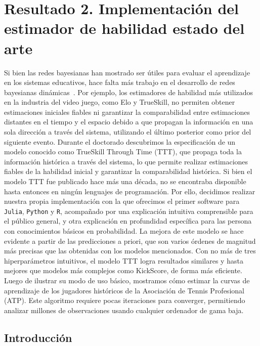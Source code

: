 \documentclass[a4paper,11pt]{book}
\theoremstyle{definition}
\begin{document}
\chapter{Resultado 2. Implementaci\'on del estimador de habilidad estado del arte} \label{ch_ttt}

Si bien las redes bayesianas han mostrado ser \'utiles para evaluar el aprendizaje en los sistemas educativos, hace falta m\'as trabajo en el desarrollo de redes bayesianas din\'amicas~\cite{Almond2015}.
%
Por ejemplo, los estimadores de habilidad m\'as utilizados en la industria del video juego, como Elo y TrueSkill, no permiten obtener estimaciones iniciales fiables ni garantizar la comparabilidad entre estimaciones distantes en el tiempo y el espacio debido a que propagan la informaci\'on en una sola direcci\'on a trav\'es del sistema, utilizando el \'ultimo posterior como prior del siguiente evento.
%
Durante el doctorado descubrimos la especificaci\'on de un modelo conocido como TrueSkill Through Time (TTT), que propaga toda la informaci\'on hist\'orica a trav\'es del sistema, lo que permite realizar estimaciones fiables de la habilidad inicial y garantizar la comparabilidad hist\'orica.
%
Si bien el modelo TTT fue publicado hace m\'as una d\'ecada, no se encontraba disponible hasta entonces en ning\'un lenguajes de programaci\'on.
%
Por ello, decidimos realizar nuestra propia implementaci\'on con la que ofrecimos el primer software para \texttt{Julia}, \texttt{Python} y \texttt{R}, acompa\~nado por una explicaci\'on intuitiva comprensible para el p\'ublico general, y otra explicaci\'on en profundidad espec\'ifica para las persona con conocimientos b\'asicos en probabilidad.
%
La mejora de este modelo se hace evidente a partir de las predicciones a priori, que son varios \'ordenes de magnitud m\'as precisas que las obtenidas con los modelos mencionados.
%
Con no m\'as de tres hiperpar\'ametros intuitivos, el modelo TTT logra resultados similares y hasta mejores que modelos m\'as complejos como KickScore, de forma m\'as eficiente.
%
Luego de ilustrar su modo de uso b\'asico, mostramos c\'omo estimar la curvas de aprendizaje de los jugadores hist\'oricos de la Asociaci\'on de Tennis Profesional (ATP).
%
Este algoritmo requiere pocas iteraciones para converger, permitiendo analizar millones de observaciones usando cualquier ordenador de gama baja.

\section{Introducci\'on} \label{sec:intro}
\end{document}
